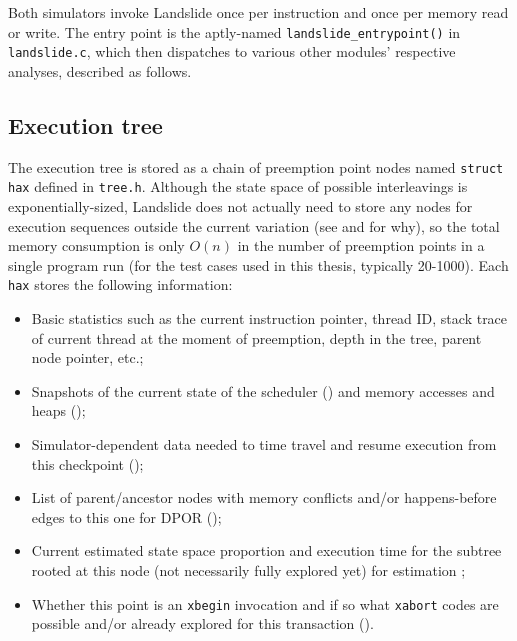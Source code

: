 Both simulators invoke Landslide once per instruction and once per memory read or write.
The entry point is the aptly-named {\tt landslide\_entrypoint()} in {\tt landslide.c},
which then dispatches to various other modules' respective analyses, described as follows.


\subsection{Execution tree}
\label{sec:landslide-save}

The execution tree
is stored as a chain of preemption point nodes named {\tt struct hax} defined in {\tt tree.h}.
Although the state space of possible interleavings is exponentially-sized,
Landslide does not actually need to store any nodes for execution sequences outside the current variation
(see \sect{\ref{sec:landslide-estimate}} and \sect{\ref{sec:landslide-dpor}} for why),
so the total memory consumption is only $O(n)$ in the number of preemption points in a single program run
(for the test cases used in this thesis, typically 20-1000).
Each {\tt hax} stores the following information:

\begin{itemize}
	\item Basic statistics such as the current instruction pointer, thread ID,
		stack trace of current thread at the moment of preemption,
		depth in the tree, parent node pointer, etc.;
	\item Snapshots of the current state of the scheduler (\sect{\ref{sec:landslide-scheduler}})
		and memory accesses and heaps (\sect{\ref{sec:landslide-memory}});
	\item Simulator-dependent data needed to time travel and resume execution
		from this checkpoint (\sect{\ref{sec:landslide-timetravel}});
	\item List of parent/ancestor nodes with memory conflicts and/or happens-before edges to this one
		for DPOR (\sect{\ref{sec:landslide-dpor}});
	\item Current estimated state space proportion and execution time for the subtree rooted at this node
		(not necessarily fully explored yet) for estimation \sect{\ref{sec:landslide-estimate}};
	\item Whether this point is an {\tt xbegin} invocation
		and if so what {\tt xabort} codes are possible and/or already explored for this transaction
		(\sect{\ref{chap:tm}}).
\end{itemize}

